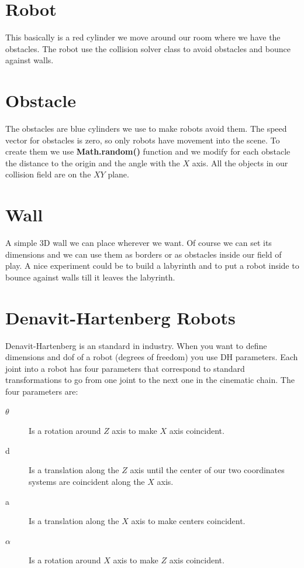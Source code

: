 \documentclass[12pt,a4paper,oneside,english]{book}
\begin{document}
\begin{verbatim}
\end{verbatim}

\section{Robot}

This basically is a red cylinder we move around our room where we have the obstacles. The robot use the collision solver class to avoid obstacles and bounce against walls.

\section{Obstacle}

The obstacles are blue cylinders we use to make robots avoid them. The speed vector for obstacles is zero, so only robots have movement into the scene. To create them we use \textbf{Math.random()} function and we modify for each obstacle the distance to the origin and the angle with the $X$ axis. All the objects in our collision field are on the $XY$ plane.

\section{Wall}

A simple 3D wall we can place wherever we want. Of course we can set its dimensions and we can use them as borders or as obstacles inside our field of play. A nice experiment could be to build a labyrinth and to put a robot inside to bounce against walls till it leaves the labyrinth.

\section{Denavit-Hartenberg Robots}

Denavit-Hartenberg is an standard in industry. When you want to define dimensions and dof of a robot (degrees of freedom) you use DH parameters. Each joint into a robot has four parameters that correspond to standard transformations to go from one joint to the next one in the cinematic chain. The four parameters are:

\begin{description}
\item[$\theta$ ] Is a rotation around $Z$ axis to make $X$ axis coincident.
\item[d ] Is a translation along the $Z$ axis until the center of our two coordinates systems are coincident along the $X$ axis.
\item[a ] Is a translation along the $X$ axis to make centers coincident.
\item[$\alpha$ ] Is a rotation around $X$ axis to make $Z$ axis coincident.
\end{description}
\end{document}
